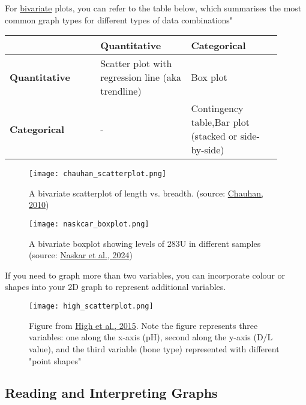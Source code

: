\documentclass{article}
\begin{document}
For \underline{bivariate} plots, you can refer to the table below, which summarises the most common graph types for different types of data combinations"

\begin{center}
    \begin{tabular}{|>{\centering\arraybackslash}p{0.3\linewidth} | >{\centering\arraybackslash}p{0.3\linewidth}| >{\centering\arraybackslash}p{0.3\linewidth}|}
    \hline
         & \textbf{Quantitative} & \textbf{Categorical} \\
         \hline
     \textbf{Quantitative} & Scatter plot with regression line (aka trendline) & Box plot\\
     \hline
     \textbf{Categorical} & - & Contingency table,Bar plot (stacked or side-by-side)\\
     \hline
    \end{tabular}
\end{center}

\newpage
\begin{figure}[hbt!]
    \centering
    \texttt{[image: chauhan\_scatterplot.png]}
    \caption{A bivariate scatterplot of length vs. breadth. (source: \protect\hyperlink{chauhan}{Chauhan, 2010})}
    \label{fig:chauhan_scatterplot}
\end{figure}

\begin{figure} [hbt!]
    \centering
    \texttt{[image: naskcar\_boxplot.png]}
    \caption{A bivariate boxplot showing levels of 283U in different samples (source: \protect\hyperlink{naskar}{Naskar et al., 2024})}
    \label{fig:naskar_boxplot}
\end{figure}

\newpage
If you need to graph more than two variables, you can incorporate colour or shapes into your 2D graph to represent additional variables. 
\begin{figure}[hbt!]
    \centering
    \texttt{[image: high\_scatterplot.png]}
    \caption{Figure from \protect\hyperlink{high}{High et al., 2015}. Note the figure represents three variables: one along the x-axis (pH), second along the y-axis (D/L value), and the third variable (bone type) represented with different "point shapes"}
\end{figure}

\subsection{Reading and Interpreting Graphs}
\end{document}
